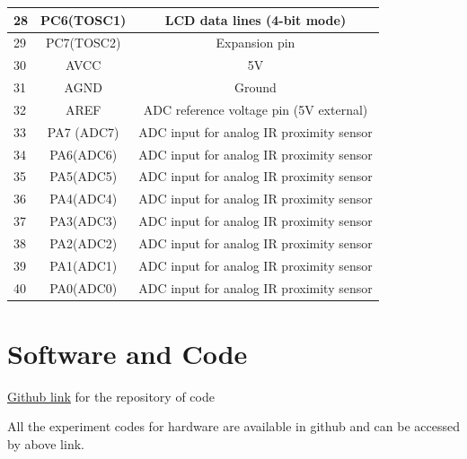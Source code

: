 \documentclass[a4paper,12pt,oneside]{book}
\begin{document}
\begin{itemize}
\begin{tabular*}{\textwidth}{|l|c|c|}
	\hline
	28 & PC6(TOSC1) & LCD data lines (4-bit mode) \\
	\hline
	29 & PC7(TOSC2) & Expansion pin \\
	\hline
	30 & AVCC & 5V \\
	\hline
	31 & AGND & Ground \\
	\hline
	32 & AREF & ADC reference voltage pin (5V external) \\
	\hline
	33 & PA7 (ADC7) & ADC input for analog IR proximity sensor\\
	\hline
	34 & PA6(ADC6) & ADC input for analog IR proximity sensor\\
	\hline
	35 & PA5(ADC5) & ADC input for analog IR proximity sensor\\
	\hline
	36 & PA4(ADC4) & ADC input for analog IR proximity sensor\\
	\hline
	37 & PA3(ADC3) & ADC input for analog IR proximity sensor\\
	\hline
	38 & PA2(ADC2) & ADC input for analog IR proximity sensor\\
	\hline
	39 & PA1(ADC1) & ADC input for analog IR proximity sensor\\
	\hline
	40 & PA0(ADC0) & ADC input for analog IR proximity sensor\\
	\hline
\end{tabular*}

\end{itemize}

\chapter{Software and Code}
\href{https://github.com/eYSIP-2017/eYSIP-2017_DistributedRobotics.git}{Github link} for the repository of code

All the experiment codes for hardware are available in github and can be accessed by above link.
\end{document}
